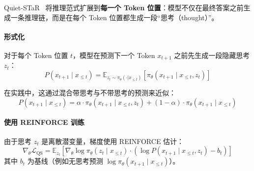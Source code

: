 Quiet-STaR~\cite{zelikman2024quietstar} 将推理范式扩展到\textbf{每一个 Token 位置}：模型不仅在最终答案之前生成一条推理链，而是在每个 Token 位置都生成一段“思考（thought）”。

\paragraph{形式化}
\label{formulation}

对于每个 Token 位置 $t$，模型在预测下一个 Token $x_{t+1}$ 之前先生成一段隐藏思考 $z_t$：
\begin{equation}
    P(x_{t+1} \mid x_{\leq t}) = \mathbb{E}_{z_t \sim \pi_\theta(\cdot | x_{\leq t})} \left[ \pi_\theta(x_{t+1} \mid x_{\leq t}, z_t) \right]
\end{equation}

在实践中，这通过混合带思考与不带思考的预测来近似：
\begin{equation}
    P(x_{t+1} \mid x_{\leq t}) = \alpha \cdot \pi_\theta(x_{t+1} \mid x_{\leq t}, z_t) + (1-\alpha) \cdot \pi_\theta(x_{t+1} \mid x_{\leq t})
\end{equation}

\paragraph{使用 REINFORCE 训练}
\label{training-with-reinforce}

由于思考 $z_t$ 是离散潜变量，梯度使用 REINFORCE 估计：
\begin{equation}
    \nabla_\theta \mathcal{L}_{\text{QS}} = \mathbb{E}_{z_t} \left[ \nabla_\theta \log \pi_\theta(z_t \mid x_{\leq t}) \cdot \left( \log P(x_{t+1} \mid x_{\leq t}, z_t) - b_t \right) \right]
\end{equation}
其中 $b_t$ 为基线（例如无思考预测 $\log \pi_\theta(x_{t+1} \mid x_{\leq t})$）。

